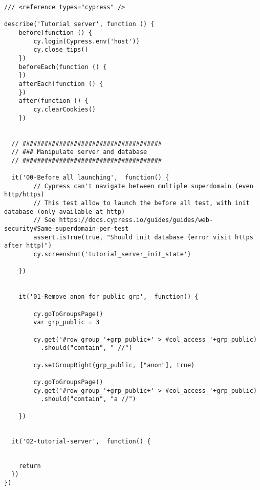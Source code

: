 
\begin{verbatim}
/// <reference types="cypress" />

describe('Tutorial server', function () {
    before(function () {
        cy.login(Cypress.env('host'))
        cy.close_tips()
    })
    beforeEach(function () {
    })
    afterEach(function () {
    })
    after(function () {
        cy.clearCookies()
    })


  // ######################################
  // ### Manipulate server and database
  // ######################################

  it('00-Before all launching',  function() {
        // Cypress can't navigate between multiple superdomain (even http/https)
        // This test allow to launch the before all test, with init database (only available at http)
        // See https://docs.cypress.io/guides/guides/web-security#Same-superdomain-per-test
        assert.isTrue(true, "Should init database (error visit https after http)")
        cy.screenshot('tutorial_server_init_state')

    })


    it('01-Remove anon for public grp',  function() {

        cy.goToGroupsPage()
        var grp_public = 3

        cy.get('#row_group_'+grp_public+' > #col_access_'+grp_public)
          .should("contain", " //")

        cy.setGroupRight(grp_public, ["anon"], true)

        cy.goToGroupsPage()
        cy.get('#row_group_'+grp_public+' > #col_access_'+grp_public)
          .should("contain", "a //")

    })


  it('02-tutorial-server',  function() {


\end{verbatim}



\begin{verbatim}
    return
  })
})

\end{verbatim}
